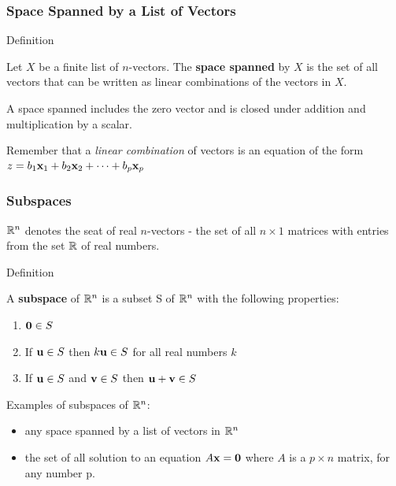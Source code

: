 \documentclass{beamer}
\begin{document}
\begin{frame}
  \frametitle{Space Spanned by a List of Vectors}


\begin{block}{Definition}

Let $X$ be a finite list of $n$-vectors. The \textbf{space spanned} by $X$ is the set of all vectors that can be written as linear combinations of the vectors in $X$.
\medskip

A space spanned includes the zero vector and is closed under addition and multiplication by a scalar.

\end{block}
\bigskip

Remember that a \emph{linear combination} of vectors is an equation of the form $z = b_1 \mathbf{x}_1 + b_2 \mathbf{x}_2 + \cdots + b_p \mathbf{x}_p$

\end{frame}



\begin{frame}
  \frametitle{Subspaces}

$\mathbb{R}^n$  denotes the seat of real $n$-vectors - the set of all $n \times 1$ matrices with entries from the set $\mathbb{R}$ of real numbers.
\medskip

\begin{block}{Definition}

A \textbf{subspace} of $\mathbb{R}^n$ is a subset S of $\mathbb{R}^n$ with the following properties:
\begin{enumerate}
	\item $\mathbf{0} \in S$
	\item If $\mathbf{u} \in S$ then $k\mathbf{u} \in S$ for all real numbers $k$
	\item If $\mathbf{u} \in S$ and  $\mathbf{v} \in S$ then $\mathbf{u} + \mathbf{v} \in S$
\end{enumerate}

\end{block}

Examples of subspaces of $\mathbb{R}^n$:
\begin{itemize}
	\item any space spanned by a list of vectors in $\mathbb{R}^n$
	\item the set of all solution to an equation $A\mathbf{x} = \mathbf{0}$ where $A$ is a $p \times n$ matrix, for any number p.
\end{itemize}

\end{frame}
\end{document}
